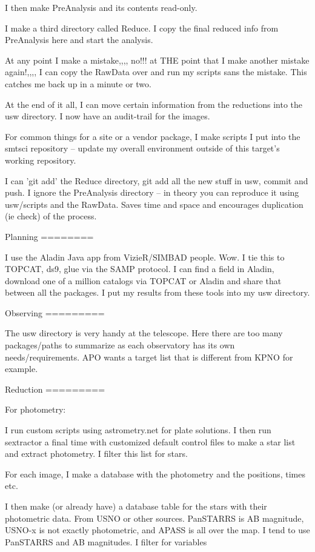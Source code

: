 I then make PreAnalysis and its contents read-only.

I make a third directory called Reduce. I copy the final reduced
info from PreAnalysis here and start the analysis.

At any point I make a mistake,,,, no!!! at THE point that I make another
mistake again!,,,, I can copy the RawData over and run my scripts sans
the mistake. This catches me back up in a minute or two. 

At the end of it all, I can move certain information from the reductions
into the usw directory. I now have an audit-trail for the images.

For common things for a site or a vendor package, I make scripts
I put into the smtsci repository -- update my overall environment
outside of this target's working repository.

I can 'git add' the Reduce directory, git add all the new stuff in
usw, commit and push. I ignore the PreAnalysis directory -- in theory
you can reproduce it using usw/scripts and the RawData. Saves time and
space and encourages duplication (ie check) of the process.


Planning
========

I use the Aladin Java app from VizieR/SIMBAD people. Wow.
I tie this to TOPCAT, ds9, glue via the SAMP protocol.
I can find a field in Aladin, download one of a million
catalogs via TOPCAT or Aladin and share that between all the
packages. I put my results from these tools into my usw
directory.

Observing
=========

The usw directory is very handy at the telescope. Here there
are too many packages/paths to summarize as each observatory
has its own needs/requirements. APO wants a target list
that is different from KPNO for example.


Reduction
=========

For photometry:

I run custom scripts using astrometry.net for plate solutions. I then
run sextractor a final time with customized default control files to
make a star list and extract photometry. I filter this list for stars.

For each image, I make a database with the photometry and the positions,
times etc.

I then make (or already have) a database table for the stars with their
photometric data. From USNO or other sources. PanSTARRS is AB magnitude,
USNO-x is not exactly photometric, and APASS is all over the map.
I tend to use PanSTARRS and AB magnitudes. I filter for variables

